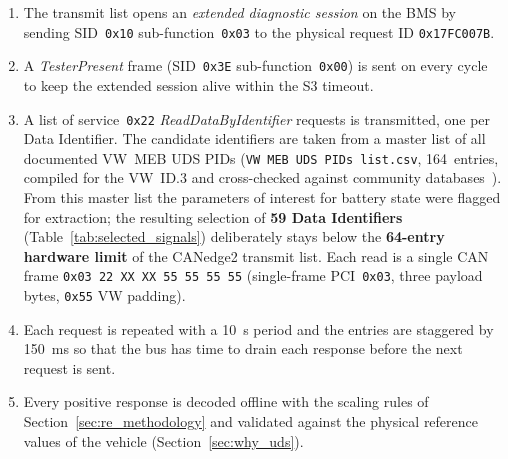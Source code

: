 \documentclass[11pt,a4paper,oneside,parskip=half]{scrreprt}
\providecommand{\hex}{}\renewcommand{\hex}[1]{\texttt{0x#1}}
\begin{document}
\begin{enumerate}
  \item The transmit list opens an \textit{extended diagnostic session} on the BMS by sending SID~\hex{10} sub-function~\hex{03} to the physical request ID \hex{17FC007B}.
  \item A \textit{TesterPresent} frame (SID~\hex{3E} sub-function~\hex{00}) is sent on every cycle to keep the extended session alive within the S3 timeout.
  \item A list of service~\hex{22} \textit{ReadDataByIdentifier} requests is transmitted, one per Data Identifier. The candidate identifiers are taken from a master list of all documented VW~MEB UDS PIDs (\texttt{VW MEB UDS PIDs list.csv}, 164~entries, compiled for the VW~ID.3 and cross-checked against community databases~\cite{opendbc}). From this master list the parameters of interest for battery state were flagged for extraction; the resulting selection of \textbf{59 Data Identifiers} (Table~\ref{tab:selected_signals}) deliberately stays below the \textbf{64-entry hardware limit} of the CANedge2 transmit list. Each read is a single CAN frame \hex{03 22 XX XX 55 55 55 55} (single-frame PCI~\hex{03}, three payload bytes, \hex{55} VW padding).
  \item Each request is repeated with a 10~s period and the entries are staggered by 150~ms so that the bus has time to drain each response before the next request is sent.
  \item Every positive response is decoded offline with the scaling rules of Section~\ref{sec:re_methodology} and validated against the physical reference values of the vehicle (Section~\ref{sec:why_uds}).
\end{enumerate}
\end{document}
